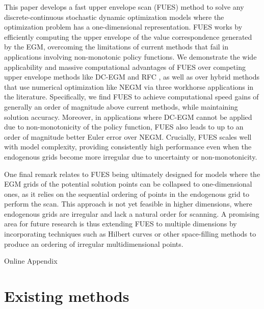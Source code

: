 \documentclass[12pt]{article}
\begin{document}
This paper develops a fast upper envelope scan (FUES) method to solve any discrete-continuous stochastic dynamic optimization models where the optimization problem has a one-dimensional representation. FUES works by efficiently computing the upper envelope of the value correspondence generated by the EGM, overcoming the limitations of current methods that fail in applications involving non-monotonic policy functions. We demonstrate the wide applicability and massive computational advantages of FUES over competing upper envelope methods like DC-EGM \citep{Iskhakov2017} and RFC \citep{DS2024RFC}, as well as over hybrid methods that use numerical optimization like NEGM \citep{Druedahl2021} via three workhorse applications in the literature. Specifically, we find FUES to achieve computational speed gains of generally an order of magnitude above current methods, while maintaining solution accuracy. Moreover, in applications where DC-EGM cannot be applied due to non-monotonicity of the policy function, FUES also leads to up to an order of magnitude better Euler error over NEGM. Crucially, FUES scales well with model complexity, providing consistently high performance even when the endogenous grids become more irregular due to uncertainty or non-monotonicity.

One final remark relates to FUES being ultimately designed for models where the EGM grids of the potential solution points can be collapsed to one-dimensional ones, as it relies on the sequential ordering of points in the endogenous grid to perform the scan. This approach is not yet feasible in higher dimensions, where endogenous grids are irregular and lack a natural order for scanning. A promising area for future research is thus extending FUES to multiple dimensions by incorporating  techniques such as Hilbert curves or other space-filling methods to produce an ordering of irregular multidimensional points. 



 


\newpage 

\appendix

{\huge Online Appendix}


\section{Existing methods}\label{appx:existing}
\end{document}
